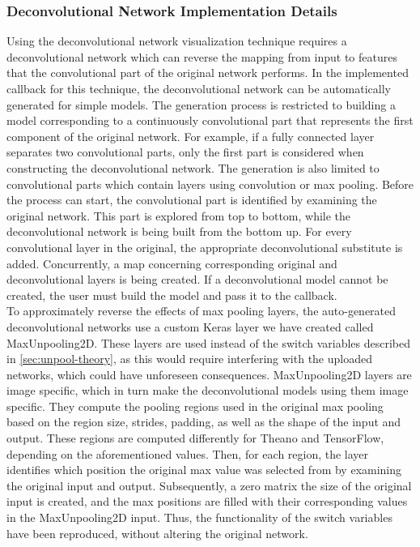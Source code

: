 \subsubsection{Deconvolutional Network Implementation Details}

Using the deconvolutional network visualization technique requires a deconvolutional network which can reverse the mapping from input to features that the convolutional part of the original network performs. In the implemented callback for this technique, the deconvolutional network can be automatically generated for simple models. The generation process is restricted to building a model corresponding to a continuously convolutional part that represents the first component of the original network. For example, if a fully connected layer separates two convolutional parts, only the first part is considered when constructing the deconvolutional network. The generation is also limited to convolutional parts which contain layers using convolution or max pooling. Before the process can start, the convolutional part is identified by examining the original network. This part is explored from top to bottom, while the deconvolutional network is being built from the bottom up. For every convolutional layer in the original, the appropriate deconvolutional substitute is added. Concurrently, a map concerning corresponding original and deconvolutional layers is being created. If a deconvolutional model cannot be created, the user must build the model and pass it to the callback. \\

\noindent To approximately reverse the effects of max pooling layers, the auto-generated deconvolutional networks use a custom Keras layer we have created called MaxUnpooling2D. These layers are used instead of the switch variables described in \autoref{sec:unpool-theory}, as this would require interfering with the uploaded networks, which could have unforeseen consequences. MaxUnpooling2D layers are image specific, which in turn make the deconvolutional models using them image specific. They compute the pooling regions used in the original max pooling based on the region size, strides, padding, as well as the shape of the input and output. These regions are computed differently for Theano and TensorFlow, depending on the aforementioned values. Then, for each region, the layer identifies which position the original max value was selected from by examining the original input and output. Subsequently, a zero matrix the size of the original input is created, and the max positions are filled with their corresponding values in the MaxUnpooling2D input. Thus, the functionality of the switch variables have been reproduced, without altering the original network.  \\

